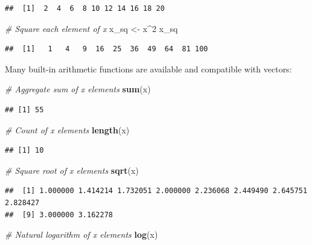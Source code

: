 \documentclass[]{book}
\newenvironment{Shaded}{\begin{snugshade}}{\end{snugshade}}
\newcommand{\CommentTok}[1]{\textcolor[rgb]{0.56,0.35,0.01}{\textit{#1}}}
\newcommand{\DecValTok}[1]{\textcolor[rgb]{0.00,0.00,0.81}{#1}}
\newcommand{\KeywordTok}[1]{\textcolor[rgb]{0.13,0.29,0.53}{\textbf{#1}}}
\newcommand{\NormalTok}[1]{#1}
\newcommand{\OperatorTok}[1]{\textcolor[rgb]{0.81,0.36,0.00}{\textbf{#1}}}
\newcommand{\StringTok}[1]{\textcolor[rgb]{0.31,0.60,0.02}{#1}}
\begin{document}
\begin{verbatim}
##  [1]  2  4  6  8 10 12 14 16 18 20
\end{verbatim}

\begin{Shaded}
\begin{Highlighting}[]
\CommentTok{# Square each element of x}
\NormalTok{x_sq <-}\StringTok{ }\NormalTok{x}\OperatorTok{^}\DecValTok{2}
\NormalTok{x_sq}
\end{Highlighting}
\end{Shaded}

\begin{verbatim}
##  [1]   1   4   9  16  25  36  49  64  81 100
\end{verbatim}

Many built-in arithmetic functions are available and compatible with vectors:

\begin{Shaded}
\begin{Highlighting}[]
\CommentTok{# Aggregate sum of x elements}
\KeywordTok{sum}\NormalTok{(x)}
\end{Highlighting}
\end{Shaded}

\begin{verbatim}
## [1] 55
\end{verbatim}

\begin{Shaded}
\begin{Highlighting}[]
\CommentTok{# Count of x elements}
\KeywordTok{length}\NormalTok{(x)}
\end{Highlighting}
\end{Shaded}

\begin{verbatim}
## [1] 10
\end{verbatim}

\begin{Shaded}
\begin{Highlighting}[]
\CommentTok{# Square root of x elements}
\KeywordTok{sqrt}\NormalTok{(x)}
\end{Highlighting}
\end{Shaded}

\begin{verbatim}
##  [1] 1.000000 1.414214 1.732051 2.000000 2.236068 2.449490 2.645751 2.828427
##  [9] 3.000000 3.162278
\end{verbatim}

\begin{Shaded}
\begin{Highlighting}[]
\CommentTok{# Natural logarithm of x elements}
\KeywordTok{log}\NormalTok{(x)}
\end{Highlighting}
\end{Shaded}
\end{document}

